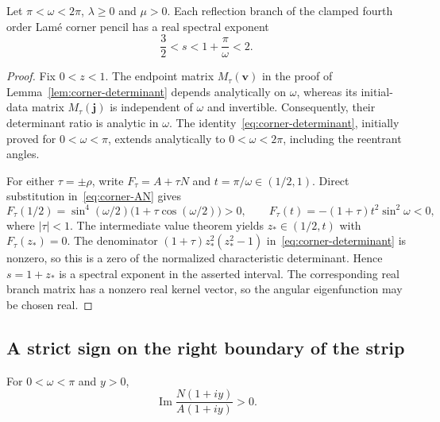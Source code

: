 \begin{lemma}\label{lem:reentrant-spectrum}
Let $\pi<\omega<2\pi$, $\lambda\geq0$ and $\mu>0$. Each reflection branch of the clamped fourth order Lam\'e corner pencil has a real spectral exponent
\[
\frac32<s<1+\frac\pi\omega<2.
\]
\end{lemma}
\begin{proof}
Fix $0<z<1$. The endpoint matrix $M_\tau(\boldsymbol v)$ in the proof of Lemma~\ref{lem:corner-determinant} depends analytically on $\omega$, whereas its initial-data matrix $M_\tau(\boldsymbol j)$ is independent of $\omega$ and invertible. Consequently, their determinant ratio is analytic in $\omega$. The identity~\eqref{eq:corner-determinant}, initially proved for $0<\omega<\pi$, extends analytically to $0<\omega<2\pi$, including the reentrant angles.

For either $\tau=\pm\rho$, write $F_\tau=A+\tau N$ and $t=\pi/\omega\in(1/2,1)$. Direct substitution in~\eqref{eq:corner-AN} gives
\[
F_\tau(1/2)=\sin^4(\omega/2)\big(1+\tau\cos(\omega/2)\big)>0,\qquad
F_\tau(t)=-(1+\tau)t^2\sin^2\omega<0,
\]
where $|\tau|<1$.
The intermediate value theorem yields $z_\ast\in(1/2,t)$ with $F_\tau(z_\ast)=0$. The denominator $(1+\tau)z_\ast^2(z_\ast^2-1)$ in~\eqref{eq:corner-determinant} is nonzero, so this is a zero of the normalized characteristic determinant. Hence $s=1+z_\ast$ is a spectral exponent in the asserted interval. The corresponding real branch matrix has a nonzero real kernel vector, so the angular eigenfunction may be chosen real.
\end{proof}

\subsection{A strict sign on the right boundary of the strip}

\begin{lemma}\label{lem:corner-critical-sign}
For $0<\omega<\pi$ and $y>0$,
\[
\operatorname{Im}\frac{N(1+iy)}{A(1+iy)}>0.
\]
\end{lemma}

